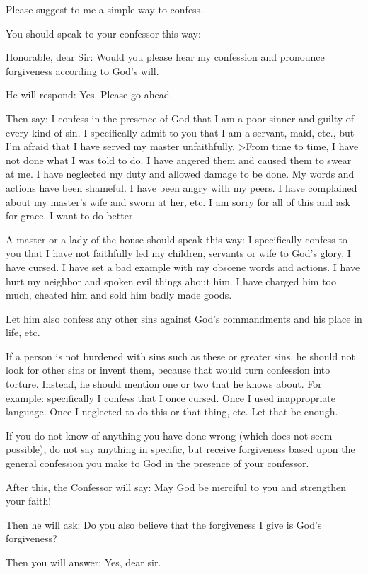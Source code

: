 Please suggest to me a simple way to confess.

You should speak to your confessor this way:

Honorable, dear Sir: Would you please hear my confession and pronounce
forgiveness according to God's will.

He will respond: Yes. Please go ahead.

Then say:
I confess in the presence of God that I am a poor sinner and guilty of
every kind of sin. I specifically admit to you that I am a servant,
maid, etc., but I'm afraid that I have served my master unfaithfully.
>From time to time, I have not done what I was told to do. I have
angered them and caused them to swear at me. I have neglected my duty
and allowed damage to be done. My words and actions have been shameful.
I have been angry with my peers. I have complained about my master's
wife and sworn at her, etc. I am sorry for all of this and ask for
grace. I want to do better.

A master or a lady of the house should speak this way:
I specifically confess to you that I have not faithfully led my
children, servants or wife to God's glory. I have cursed. I have set a
bad example with my obscene words and actions. I have hurt my neighbor
and spoken evil things about him. I have charged him too much, cheated
him and sold him badly made goods.

Let him also confess any other sins against God's commandments and his
place in life, etc.

If a person is not burdened with sins such as these or greater sins, he
should not look for other sins or invent them, because that would turn
confession into torture. Instead, he should mention one or two that he
knows about. For example: specifically I confess that I once cursed.
Once I used inappropriate language. Once I neglected to do this or that
thing, etc. Let that be enough.

If you do not know of anything you have done wrong (which does not seem
possible), do not say anything in specific, but receive forgiveness
based upon the general confession you make to God in the presence of
your confessor.

After this, the Confessor will say:
May God be merciful to you and strengthen your faith!

Then he will ask:
Do you also believe that the forgiveness I give is God's forgiveness?

Then you will answer:
Yes, dear sir.

